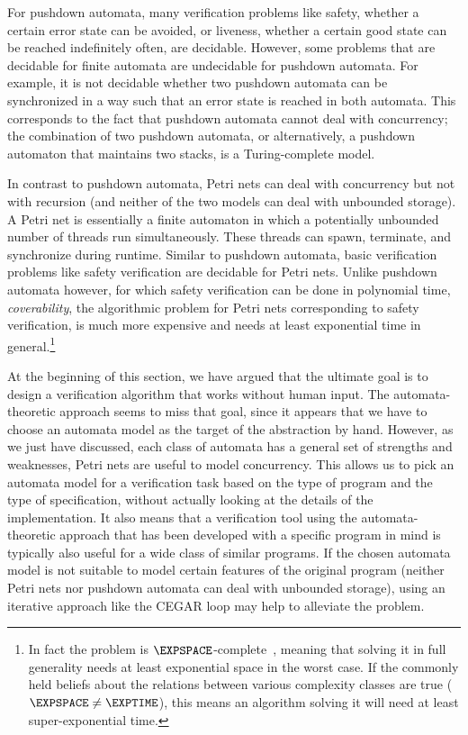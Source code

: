 \documentclass[../../diss.tex]{subfiles}
\begin{document}
For pushdown automata, many verification problems like safety, \ie whether a certain error state can be avoided, or liveness, \ie whether a certain good state can be reached indefinitely often, are decidable.
However, some problems that are decidable for finite automata are undecidable for pushdown automata.
For example, it is not decidable whether two pushdown automata can be synchronized in a way such that an error state is reached in both automata.
This corresponds to the fact that pushdown automata cannot deal with concurrency; the combination of two pushdown automata, or alternatively, a pushdown automaton that maintains two stacks, is a Turing-complete model.

In contrast to pushdown automata, Petri nets can deal with concurrency but not with recursion (and neither of the two models can deal with unbounded storage).
A Petri net is essentially a finite automaton in which a potentially unbounded number of threads run simultaneously.
These threads can spawn, terminate, and synchronize during runtime.
Similar to pushdown automata, basic verification problems like safety verification are decidable for Petri nets.
Unlike pushdown automata however, for which safety verification can be done in polynomial time, \emph{coverability}, the algorithmic problem for Petri nets corresponding to safety verification, is much more expensive and needs at least exponential time in general.\footnote{%
In fact the problem is $\EXPSPACE$-complete~\cite{Lipton76}, meaning that solving it in full generality needs at least exponential space in the worst case.
If the commonly held beliefs about the relations between various complexity classes are true ($\EXPSPACE \neq \EXPTIME$), this means an algorithm solving it will need at least super-exponential time.%
}%

At the beginning of this section, we have argued that the ultimate goal is to design a verification algorithm that works without human input.
The automata-theoretic approach seems to miss that goal, since it appears that we have to choose an automata model as the target of the abstraction by hand.
However, as we just have discussed, each class of automata has a general set of strengths and weaknesses, \eg Petri nets are useful to model concurrency.
This allows us to pick an automata model for a verification task based on the type of program and the type of specification, without actually looking at the details of the implementation.
It also means that a verification tool using the automata-theoretic approach that has been developed with a specific program in mind is typically also useful for a wide class of similar programs.
If the chosen automata model is not suitable to model certain features of the original program (\eg neither Petri nets nor pushdown automata can deal with unbounded storage), using an iterative approach like the CEGAR loop may help to alleviate the problem.
\end{document}
